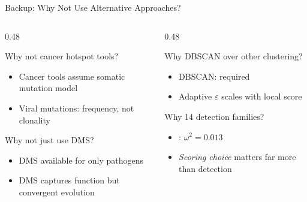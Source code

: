 \begin{frame}[noframenumbering]{Backup: Why Not Use Alternative Approaches?}
  \scriptsize
  \begin{columns}[T]
    \begin{column}{0.48\textwidth}
      \begin{block}{Why not cancer hotspot tools?}
        \begin{itemize}
          \item Cancer tools assume somatic mutation model
          \item Viral mutations:  frequency, not clonality
        \end{itemize}
      \end{block}
      \begin{block}{Why not just use DMS?}
        \begin{itemize}
          \item DMS available for only  pathogens
          \item DMS captures function but  convergent evolution
        \end{itemize}
      \end{block}
    \end{column}
    \begin{column}{0.48\textwidth}
      \begin{block}{Why DBSCAN over other clustering?}
        \begin{itemize}
          \item DBSCAN:  required
          \item Adaptive $\varepsilon$ scales with local score
        \end{itemize}
      \end{block}
      \begin{block}{Why 14 detection families?}
        \begin{itemize}
          \item {}: $\omega^2 = 0.013$
          \item \textit{Scoring choice} matters far more than detection
        \end{itemize}
      \end{block}
    \end{column}
  \end{columns}
\end{frame}

